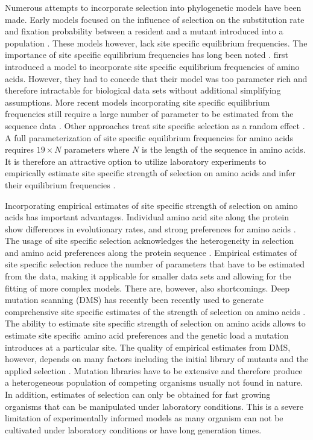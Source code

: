 Numerous attempts to incorporate selection into phylogenetic models have been made.
Early models focused on the influence of selection on the substitution rate and fixation probability between a resident and a mutant introduced into a population \citep{GoldmanAndYang1994, MuseAndGaut1994, thorne1996}.
These models however, lack site specific equilibrium frequencies.
The importance of site specific equilibrium frequencies has long been noted \citep{felsenstein1981, gojobori1983}.
\citet{HalpernAndBruno1998} first introduced a model to incorporate site specific equilibrium frequencies of amino acids.
However, they had to concede that their model was too parameter rich and therefore intractable for biological data sets without additional simplifying assumptions.
More recent models incorporating site specific equilibrium frequencies still require a large number of parameter to be estimated from the sequence data \citep{LartillotAndPhilippe2004,le2008,wang2008,holder2008,wu2013,tamuri2014}.
Other approaches treat site specific selection as a random effect \citep{rodrigue2010,rodrigue2013,rodrigue2014}.
A full parameterization of site specific equilibrium frequencies for amino acids requires $19\times N$ parameters where $N$ is the length of the sequence in amino acids.
It is therefore an attractive option to utilize laboratory experiments to empirically estimate site specific strength of selection on amino acids and infer their equilibrium frequencies \citep{bloom2014, thyagarajan2014, bloom2017}.

Incorporating empirical estimates of site specific strength of selection on amino acids has important advantages.
Individual amino acid site along the protein show differences in evolutionary rates, and strong preferences for amino acids \citep{HalpernAndBruno1998, ashenberg2013, echave2016}.
The usage of site specific selection acknowledges the heterogeneity in selection and amino acid preferences along the protein sequence \citep{hilton2017}.
Empirical estimates of site specific selection reduce the number of parameters that have to be estimated from the data, making it applicable for smaller data sets and allowing for the fitting of more complex models.
There are, however, also shortcomings.
Deep mutation scanning (DMS) has recently been recently used to generate comprehensive site specific estimates of the strength of selection on amino acids \citep{Fowler2014}.
The ability to estimate site specific strength of selection on amino acids allows to estimate site specific amino acid preferences and the genetic load a mutation introduces at a particular site\citep{bloom2014,firnberg2014,stiffler2016}.
The quality of empirical estimates from DMS, however, depends on many factors including the initial library of mutants and the applied selection \citep{FirnbergAndOstermeier2012}.
Mutation libraries have to be extensive and therefore produce a heterogeneous population of competing organisms usually not found in nature.
In addition, estimates of selection can only be obtained for fast growing organisms that can be manipulated under laboratory conditions.
This is a severe limitation of experimentally informed models as many organism can not be cultivated under laboratory conditions or have long generation times.

